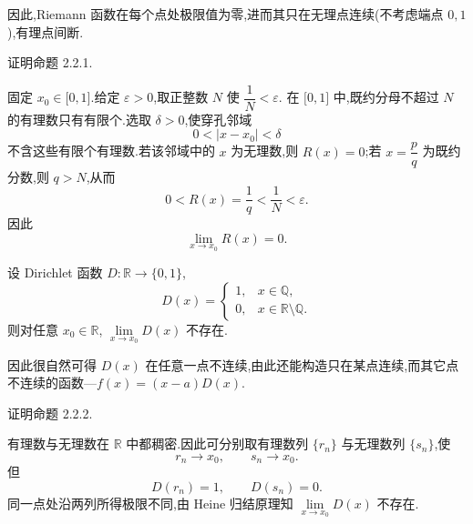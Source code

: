 \begin{remark}
    因此,Riemann 函数在每个点处极限值为零,进而其只在无理点连续(不考虑端点 $0,1$),有理点间断.
\end{remark}

\begin{example}
    证明命题 2.2.1.
\end{example}
\exampleblank

\begin{solution}
    固定 $x_0\in\lbrack0,1\rbrack$.给定 $\varepsilon>0$,取正整数 $N$ 使 $\dfrac{1}{N}<\varepsilon$.
    在 $\lbrack0,1\rbrack$ 中,既约分母不超过 $N$ 的有理数只有有限个.选取 $\delta>0$,使穿孔邻域
    \[
        0<|x-x_0|<\delta
    \]
    不含这些有限个有理数.若该邻域中的 $x$ 为无理数,则 $R(x)=0$;若
    $x=\dfrac{p}{q}$ 为既约分数,则 $q>N$,从而
    \[
        0<R(x)=\dfrac{1}{q}<\dfrac{1}{N}<\varepsilon.
    \]
    因此
    \[
        \displaystyle\lim\limits_{x\to x_0}R(x)=0.
    \]
\end{solution}

\begin{proposition}
    设 Dirichlet 函数 $D:\mathbb{R}\to\{0,1\}$,
    \[
        D(x)=
        \begin{cases}
            1, & x\in\mathbb{Q},                    \\
            0, & x\in\mathbb{R}\setminus\mathbb{Q}.
        \end{cases}
    \]
    则对任意 $x_0\in\mathbb{R}$,
    $\displaystyle\lim\limits_{x\to x_0}D(x)$ 不存在.
\end{proposition}

\begin{remark}
    因此很自然可得 $D(x)$ 在任意一点不连续,由此还能构造只在某点连续,而其它点不连续的函数---$f(x)=(x-a)D(x)$.
\end{remark}

\begin{example}
    证明命题 2.2.2.
\end{example}
\exampleblank

\begin{solution}
    有理数与无理数在 $\mathbb{R}$ 中都稠密.因此可分别取有理数列 $\{r_n\}$ 与无理数列 $\{s_n\}$,使
    \[
        r_n\to x_0,
        \qquad
        s_n\to x_0.
    \]
    但
    \[
        D(r_n)=1,
        \qquad
        D(s_n)=0.
    \]
    同一点处沿两列所得极限不同,由 Heine 归结原理知
    $\displaystyle\lim\limits_{x\to x_0}D(x)$ 不存在.
\end{solution}


